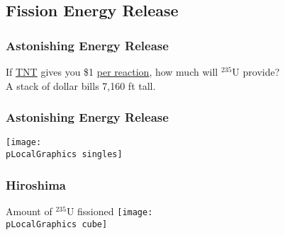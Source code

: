 
%
\subsection{Fission Energy Release}
\begin{frame}\frametitle{Astonishing Energy Release}
\center
	If \href{https://en.wikipedia.org/wiki/TNT}{TNT} gives you \$1 \href{http://chemsite.lsrhs.net/Nuclear/chemNucDifference.html}{per reaction}, how much will $^{235}$U provide? \\[20pt]
	\pause
	A stack of dollar bills 7,160 ft tall.\\[20pt]
	\pause
\end{frame}

\begin{frame}\frametitle{Astonishing Energy Release}
\center
	\texttt{[image: \\pLocalGraphics singles]}
\end{frame}

\begin{frame}\frametitle{Hiroshima\jumpLittle}
\center
	Amount of $^{235}$U fissioned 
	\texttt{[image: \\pLocalGraphics cube]}
\end{frame}

%
